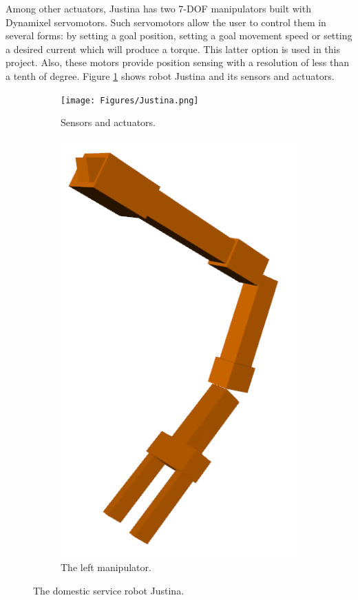 \documentclass[a4paper, 10pt]{article}
\begin{document}
Among other actuators, Justina has two 7-DOF manipulators built with Dynamixel servomotors. Such servomotors allow the user to control them in several forms: by setting a goal position, setting a goal movement speed or setting a desired current which will produce a torque. This latter option is used in this project. Also, these motors provide position sensing with a resolution of less than a tenth of degree. Figure \ref{fig:Justina} shows robot Justina and its sensors and actuators. 
\begin{figure}
  \centering
  \begin{subfigure}[b]{0.35\textwidth}
    \centering
    \texttt{[image: Figures/Justina.png]}
    \caption{Sensors and actuators.}
    \label{fig:Justina}
  \end{subfigure}
  \hfill
  \begin{subfigure}[b]{0.3\textwidth}
    \centering
    \includegraphics[width=\textwidth]{Figures/left_arm.png}
    \caption{The left manipulator.}
    \label{fig:left_arm}
  \end{subfigure}
  \caption{The domestic service robot Justina.}
\end{figure}
\end{document}
